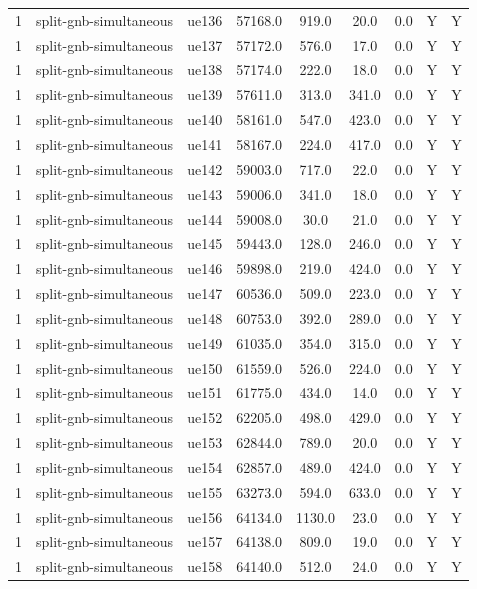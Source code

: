 \begin{table}[ht]
\begin{tabular}{|c|c|c|c|c|c|c|c|c|}
1 & split-gnb-simultaneous & ue136 & 57168.0 & 919.0 & 20.0 & 0.0 & Y & Y \\
1 & split-gnb-simultaneous & ue137 & 57172.0 & 576.0 & 17.0 & 0.0 & Y & Y \\
1 & split-gnb-simultaneous & ue138 & 57174.0 & 222.0 & 18.0 & 0.0 & Y & Y \\
1 & split-gnb-simultaneous & ue139 & 57611.0 & 313.0 & 341.0 & 0.0 & Y & Y \\
1 & split-gnb-simultaneous & ue140 & 58161.0 & 547.0 & 423.0 & 0.0 & Y & Y \\
1 & split-gnb-simultaneous & ue141 & 58167.0 & 224.0 & 417.0 & 0.0 & Y & Y \\
1 & split-gnb-simultaneous & ue142 & 59003.0 & 717.0 & 22.0 & 0.0 & Y & Y \\
1 & split-gnb-simultaneous & ue143 & 59006.0 & 341.0 & 18.0 & 0.0 & Y & Y \\
1 & split-gnb-simultaneous & ue144 & 59008.0 & 30.0 & 21.0 & 0.0 & Y & Y \\
1 & split-gnb-simultaneous & ue145 & 59443.0 & 128.0 & 246.0 & 0.0 & Y & Y \\
1 & split-gnb-simultaneous & ue146 & 59898.0 & 219.0 & 424.0 & 0.0 & Y & Y \\
1 & split-gnb-simultaneous & ue147 & 60536.0 & 509.0 & 223.0 & 0.0 & Y & Y \\
1 & split-gnb-simultaneous & ue148 & 60753.0 & 392.0 & 289.0 & 0.0 & Y & Y \\
1 & split-gnb-simultaneous & ue149 & 61035.0 & 354.0 & 315.0 & 0.0 & Y & Y \\
1 & split-gnb-simultaneous & ue150 & 61559.0 & 526.0 & 224.0 & 0.0 & Y & Y \\
1 & split-gnb-simultaneous & ue151 & 61775.0 & 434.0 & 14.0 & 0.0 & Y & Y \\
1 & split-gnb-simultaneous & ue152 & 62205.0 & 498.0 & 429.0 & 0.0 & Y & Y \\
1 & split-gnb-simultaneous & ue153 & 62844.0 & 789.0 & 20.0 & 0.0 & Y & Y \\
1 & split-gnb-simultaneous & ue154 & 62857.0 & 489.0 & 424.0 & 0.0 & Y & Y \\
1 & split-gnb-simultaneous & ue155 & 63273.0 & 594.0 & 633.0 & 0.0 & Y & Y \\
1 & split-gnb-simultaneous & ue156 & 64134.0 & 1130.0 & 23.0 & 0.0 & Y & Y \\
1 & split-gnb-simultaneous & ue157 & 64138.0 & 809.0 & 19.0 & 0.0 & Y & Y \\
1 & split-gnb-simultaneous & ue158 & 64140.0 & 512.0 & 24.0 & 0.0 & Y & Y \\

\end{tabular}
\end{table}
